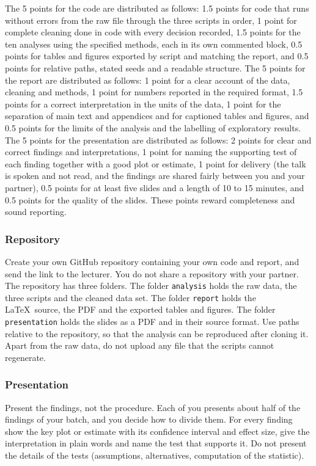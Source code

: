 \documentclass[11pt,a4paper]{article}
\begin{document}
The 5 points for the code are distributed as follows: 1.5 points for code that runs without errors from the raw file through the three scripts in order, 1 point for complete cleaning done in code with every decision recorded, 1.5 points for the ten analyses using the specified methods, each in its own commented block, 0.5 points for tables and figures exported by script and matching the report, and 0.5 points for relative paths, stated seeds and a readable structure. The 5 points for the report are distributed as follows: 1 point for a clear account of the data, cleaning and methods, 1 point for numbers reported in the required format, 1.5 points for a correct interpretation in the units of the data, 1 point for the separation of main text and appendices and for captioned tables and figures, and 0.5 points for the limits of the analysis and the labelling of exploratory results. The 5 points for the presentation are distributed as follows: 2 points for clear and correct findings and interpretations, 1 point for naming the supporting test of each finding together with a good plot or estimate, 1 point for delivery (the talk is spoken and not read, and the findings are shared fairly between you and your partner), 0.5 points for at least five slides and a length of 10 to 15 minutes, and 0.5 points for the quality of the slides. These points reward completeness and sound reporting.

\subsubsection*{Repository}

Create your own GitHub repository containing your own code and report, and send the link to the lecturer. You do not share a repository with your partner. The repository has three folders. The folder \texttt{analysis} holds the raw data, the three scripts and the cleaned data set. The folder \texttt{report} holds the \LaTeX\ source, the PDF and the exported tables and figures. The folder \texttt{presentation} holds the slides as a PDF and in their source format. Use paths relative to the repository, so that the analysis can be reproduced after cloning it. Apart from the raw data, do not upload any file that the scripts cannot regenerate.

\subsubsection*{Presentation}

Present the findings, not the procedure. Each of you presents about half of the findings of your batch, and you decide how to divide them. For every finding show the key plot or estimate with its confidence interval and effect size, give the interpretation in plain words and name the test that supports it. Do not present the details of the tests (assumptions, alternatives, computation of the statistic).
\end{document}
